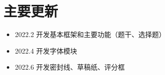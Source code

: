 
\section{主要更新}

\begin{itemize}
  \item 2022.2 开发基本框架和主要功能（题干、选择题）
  \item 2022.4 开发字体模块
  \item 2022.6 开发密封线、草稿纸、评分框
\end{itemize}